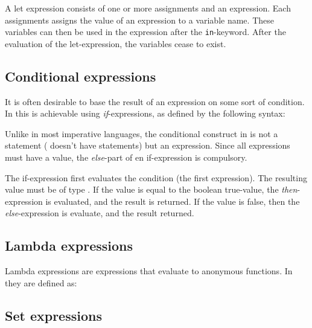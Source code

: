 A let expression consists of one or more assignments and an expression. Each assignments assigns
the value of an expression to a variable name. These variables can then be used in the expression
after the \texttt{in}-keyword. After the evaluation of the let-expression, the variables cease to
exist.


\subsection{Conditional expressions}

It is often desirable to base the result of an expression on some sort of condition.
In \productname{} this is achievable using \emph{if}-expressions, as defined by the
following syntax:

\begin{ebnf}
\end{ebnf}

Unlike in most imperative languages, the conditional construct in \productname{} is not a statement
(\productname{} doesn't have statements) but an expression. Since all expressions must have a value,
the \emph{else}-part of en if-expression is compulsory.

The if-expression first evaluates the condition (the first expression). The resulting value must be
of type . If the value is equal to the boolean true-value, the \emph{then}-expression
is evaluated, and the result is returned. If the value is false, then the \emph{else}-expression
is evaluate, and the result returned.

\subsection{Lambda expressions}

Lambda expressions are expressions that evaluate to anonymous functions. In \productname{} they
are defined as:

\begin{ebnf}
\end{ebnf}



\subsection{Set expressions}

